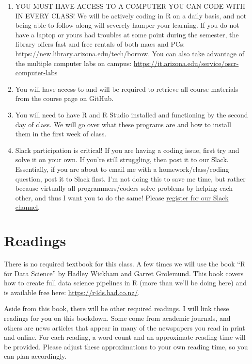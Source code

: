 \documentclass[
]{book}
\begin{document}
\begin{enumerate}
\def\labelenumi{\arabic{enumi}.}
\item
  YOU MUST HAVE ACCESS TO A COMPUTER YOU CAN CODE WITH IN EVERY CLASS! We will be actively coding in R on a daily basis, and not being able to follow along will severely hamper your learning. If you do not have a laptop or yours had troubles at some point during the semester, the library offers fast and free rentals of both macs and PCs: \url{https://new.library.arizona.edu/tech/borrow}. You can also take advantage of the multiple computer labs on campus: \url{https://it.arizona.edu/service/oscr-computer-labs}
\item
  You will have access to and will be required to retrieve all course materials from the course page on GitHub.
\item
  You will need to have R and R Studio installed and functioning by the second day of class. We will go over what these programs are and how to install them in the first week of class.
\item
  Slack participation is critical! If you are having a coding issue, first try and solve it on your own. If you're still struggling, then post it to our Slack. Essentially, if you are about to email me with a homework/class/coding question, post it to Slack first. I'm not doing this to save me time, but rather because virtually all programmers/coders solve problems by helping each other, and thus I want you to do the same! Please \href{https://join.slack.com/t/ischool-esoc214/shared_invite/zt-gbmjw9oz-8hcl5iuktuYYdsamAkPVQA}{register for our Slack channel}.
\end{enumerate}

\hypertarget{readings}{%
\section{Readings}\label{readings}}

There is no required textbook for this class. A few times we will use the book ``R for Data Science'' by Hadley Wickham and Garret Grolemund. This book covers how to create full data science pipelines in R (more than we'll be doing here) and is available free here: \url{https://r4ds.had.co.nz/}.

Aside from this book, there will be other required readings. I will link these readings for you on this bookdown. Some come from academic journals, and others are news articles that appear in many of the newspapers you read in print and online. For each reading, a word count and an approximate reading time will be provided. Please adjust these approximations to your own reading time, so you can plan accordingly.
\end{document}

